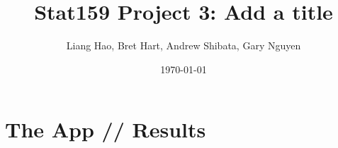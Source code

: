 \documentclass{article}
\title{Stat159 Project 3: Add a title}
\author{Liang Hao, Bret Hart, Andrew Shibata, Gary Nguyen}
\date{\today}
\begin{document}


\maketitle
\section{The App // Results}
\end{document}

